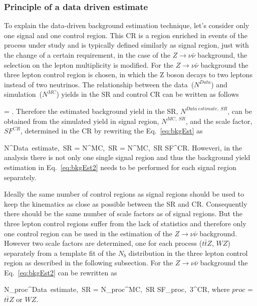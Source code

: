\subsubsection{Principle of a data driven estimate}

To explain the data-driven background estimation technique, let's consider only one signal and one control region. This CR is a region enriched in events of the process under study and is typically defined similarly as signal region, just with the change of a certain requirement, in the case of the $Z \to \nu \bar{\nu}$ background, the selection on the lepton multiplicity is modified. For the $Z \to \nu \bar{\nu}$ background the three lepton control region is chosen, in which the Z boson decays to two leptons instead of two neutrinos. The relationship between the data~($N^{Data}$) and simulation~($N^{MC}$) yields in the SR and control CR can be written as follows

{
  = .
}
Therefore the estimated background yield in the SR, $N^{Data~estimate,~SR}$, can be obtained from the simulated yield in signal region, $N^{MC,~SR}$, and the scale factor, $SF^{CR}$, determined in the CR by rewriting the Eq.~\ref{eq:bkgEst} as

{
N^{Data~estimate,~SR}  = N^{MC,~SR} \times  {} = N^{MC,~SR} \times  SF^{CR}.
}
Howeveri, in the analysis there is not only one single signal region and thus the background yield estimation in Eq.~\ref{eq:bkgEst2} needs to be performed for each signal region separately. 

Ideally the same number of control regions as signal regions should be used to keep the kinematics as close as possible between the SR and CR. Consequently there should be the same number of scale factors as of signal regions.  But the three lepton control regions suffer from the lack of statistics and therefore  only one control region can be used in the estimation of the $Z \to \nu \bar{\nu}$ background. However two scale factors are determined, one for each process ($t\bar{t}Z$, $WZ$) separately  from a template fit of the $N_{b}$ distribution in the three lepton control region as described in the following subsection. For the $Z \to \nu \bar{\nu}$ background the Eq.~\ref{eq:bkgEst2} can be rewritten as

{
N_{proc}^{Data~estimate,~SR}  = N_{proc}^{MC,~SR} \times SF_{proc,~3\ell}^{CR},
}
where $proc$ = $t\bar{t}Z$ or $WZ$.

